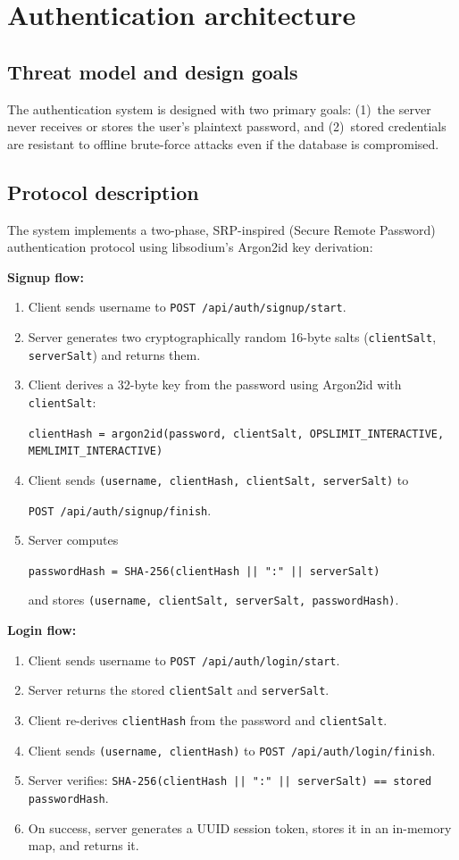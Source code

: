 \documentclass[13pt,a4paper]{report}
\begin{document}
\section{Authentication architecture}
\subsection{Threat model and design goals}
The authentication system is designed with two primary goals: (1)~the server never receives or stores the user's plaintext password, and (2)~stored credentials are resistant to offline brute-force attacks even if the database is compromised.

\subsection{Protocol description}
The system implements a two-phase, SRP-inspired (Secure Remote Password) authentication protocol using libsodium's Argon2id key derivation:

\textbf{Signup flow:}
\begin{enumerate}
    \item Client sends username to \texttt{POST /api/auth/signup/start}.
    \item Server generates two cryptographically random 16-byte salts (\texttt{clientSalt}, \texttt{serverSalt}) and returns them.
    \item Client derives a 32-byte key from the password using Argon2id with \texttt{clientSalt}:

    {\footnotesize \texttt{clientHash = argon2id(password, clientSalt,
      OPSLIMIT\_INTERACTIVE, MEMLIMIT\_INTERACTIVE)}}

    \item Client sends \texttt{(username, clientHash, clientSalt, serverSalt)} to

    \texttt{POST /api/auth/signup/finish}.
    \item Server computes

    {\small \texttt{passwordHash = SHA-256(clientHash || ":" || serverSalt)}}

    and stores \texttt{(username, clientSalt, serverSalt, passwordHash)}.
\end{enumerate}

\textbf{Login flow:}
\begin{enumerate}
    \item Client sends username to \texttt{POST /api/auth/login/start}.
    \item Server returns the stored \texttt{clientSalt} and \texttt{serverSalt}.
    \item Client re-derives \texttt{clientHash} from the password and \texttt{clientSalt}.
    \item Client sends \texttt{(username, clientHash)} to \texttt{POST /api/auth/login/finish}.
    \item Server verifies: \texttt{SHA-256(clientHash || ":" || serverSalt) == stored passwordHash}.
    \item On success, server generates a UUID session token, stores it in an in-memory map, and returns it.
\end{enumerate}
\end{document}
